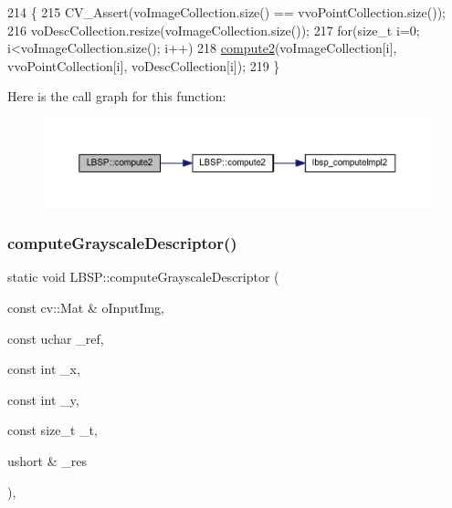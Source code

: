\begin{DoxyCode}
214                                                                                                            
                                                         \{
215     CV\_Assert(voImageCollection.size() == vvoPointCollection.size());
216     voDescCollection.resize(voImageCollection.size());
217     \textcolor{keywordflow}{for}(\textcolor{keywordtype}{size\_t} i=0; i<voImageCollection.size(); i++)
218         \mbox{\hyperlink{class_l_b_s_p_ab61148341758dbc004660761bca04f84}{compute2}}(voImageCollection[i], vvoPointCollection[i], voDescCollection[i]);
219 \}
\end{DoxyCode}
Here is the call graph for this function\+:\nopagebreak
\begin{figure}[H]
\begin{center}
\leavevmode
\includegraphics[width=350pt]{class_l_b_s_p_af02407f0a1657cd3e2b955aa250d064e_cgraph}
\end{center}
\end{figure}
\mbox{\label{class_l_b_s_p_a4a5f635868b6b81ba53df2692ee3dfd8}} 
\subsubsection{\texorpdfstring{compute\+Grayscale\+Descriptor()}{computeGrayscaleDescriptor()}}
{\footnotesize\ttfamily static void L\+B\+S\+P\+::compute\+Grayscale\+Descriptor (\begin{DoxyParamCaption}\item[{const cv\+::\+Mat \&}]{o\+Input\+Img,  }\item[{const uchar}]{\+\_\+ref,  }\item[{const int}]{\+\_\+x,  }\item[{const int}]{\+\_\+y,  }\item[{const size\+\_\+t}]{\+\_\+t,  }\item[{ushort \&}]{\+\_\+res }\end{DoxyParamCaption})\hspace{0.3cm}{\ttfamily [inline]}, {\ttfamily [static]}}



